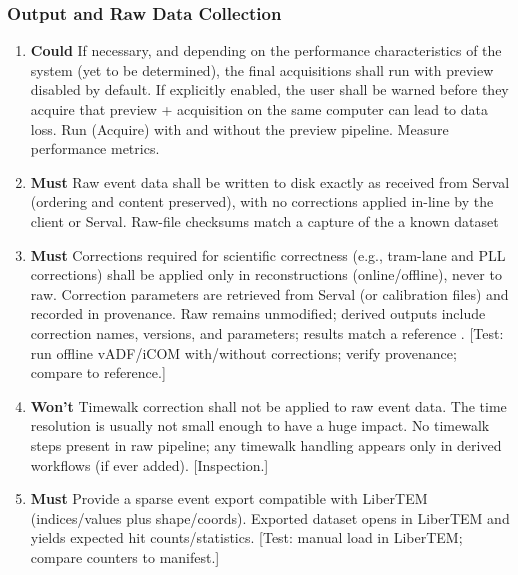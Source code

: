 \documentclass[12pt]{article}
\newcommand{\PriorityTag}[2]{%
  \colorbox{#2!25}{\footnotesize\textsf{\textbf{#1}}}\hspace{0.6em}}
\newcommand{\must}{\leavevmode\PriorityTag{Must}{green}}
\newcommand{\could}{\leavevmode\PriorityTag{Could}{cyan}}
\newcommand{\wont}{\leavevmode\PriorityTag{Won't}{red}}
\newcounter{reqgrp}[section] %
\newcounter{reqno}
\newcommand{\reqprefix}{GEN}
\newenvironment{requirements}[1]{%
  \renewcommand{\reqprefix}{#1}%
  \refstepcounter{reqgrp}%
  \setcounter{reqno}{0}%
  \begin{enumerate}[leftmargin=*]
}{\end{enumerate}}
\begin{document}
\subsubsection{Output and Raw Data Collection}
\begin{requirements}{OUT}

\item \could {}
  {If necessary, and depending on the performance characteristics of the system (yet to be determined), the final acquisitions shall run with preview disabled by default. If explicitly enabled, the user shall be warned before they acquire that preview + acquisition on the same computer can lead to data loss.}
  {Run (Acquire) with and without the preview pipeline. Measure performance metrics.}

\item \must {}
  {Raw event data shall be written to disk exactly as received from Serval (ordering and content preserved), with no corrections applied in-line by the client or Serval.}
  {Raw-file checksums match a capture of the a known dataset}

\item \must {}
  {Corrections required for scientific correctness (e.g., tram-lane and PLL corrections) shall be applied only in reconstructions (online/offline), never to raw. Correction parameters are retrieved from Serval (or calibration files) and recorded in provenance.}
  {Raw remains unmodified; derived outputs include correction names, versions, and parameters; results match a reference .}
  [Test: run offline vADF/iCOM with/without corrections; verify provenance; compare to reference.]

\item \wont {}
  {Timewalk correction shall not be applied to raw event data. The time resolution is usually not small enough to have a huge impact.}
  {No timewalk steps present in raw pipeline; any timewalk handling appears only in derived workflows (if ever added).}
  [Inspection.]

\item \must {}
  {Provide a sparse event export compatible with LiberTEM (indices/values plus shape/coords).}
  {Exported dataset opens in LiberTEM and yields expected hit counts/statistics.}
  [Test: manual load in LiberTEM; compare counters to manifest.]


\end{requirements}
\end{document}
